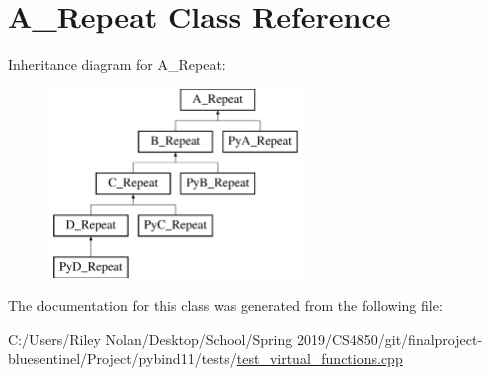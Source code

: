 \hypertarget{class_a___repeat}{}\section{A\+\_\+\+Repeat Class Reference}
\label{class_a___repeat}
Inheritance diagram for A\+\_\+\+Repeat\+:\begin{figure}[H]
\begin{center}
\leavevmode
\includegraphics[height=5.000000cm]{class_a___repeat}
\end{center}
\end{figure}


The documentation for this class was generated from the following file\+:\begin{DoxyCompactItemize}
\item 
C\+:/\+Users/\+Riley Nolan/\+Desktop/\+School/\+Spring 2019/\+C\+S4850/git/finalproject-\/bluesentinel/\+Project/pybind11/tests/\mbox{\hyperlink{test__virtual__functions_8cpp}{test\+\_\+virtual\+\_\+functions.\+cpp}}\end{DoxyCompactItemize}

